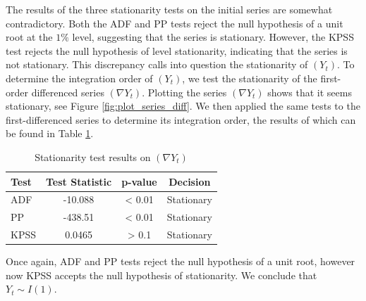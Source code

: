 \documentclass[12pt]{article}
\begin{document}
\begin{enumerate}
        The results of the three stationarity tests on the initial series are somewhat contradictory. Both the ADF and PP tests reject the null hypothesis of a unit root at the $1 \%$ level, suggesting that the series is stationary. However, the KPSS test rejects the null hypothesis of level stationarity, indicating that the series is not stationary. This discrepancy calls into question the stationarity of $(Y_t)$. To determine the integration order of $(Y_t)$, we test the stationarity of the first-order differenced series $(\nabla Y_t)$. Plotting the series $(\nabla Y_t)$ shows that it seems stationary, see Figure \ref{fig:plot_series_diff}. We then applied the same tests to the first-differenced series to determine its integration order, the results of which can be found in Table \ref{tab:stationarity_tests_diff}.
        \begin{table}[ht]
            \centering
            \begin{tabular}{l|ccc}
                \textbf{Test} & \textbf{Test Statistic} & \textbf{p-value} & \textbf{Decision} \\
                \hline
                ADF  & -10.088  & < 0.01 & Stationary \\
                PP   & -438.51  & < 0.01 & Stationary \\
                KPSS & 0.0465   & > 0.1  & Stationary
            \end{tabular}
            \caption{Stationarity test results on $(\nabla Y_t)$}
            \label{tab:stationarity_tests_diff}
        \end{table}

        Once again, ADF and PP tests reject the null hypothesis of a unit root, however now KPSS accepts the null hypothesis of stationarity. We conclude that $Y_t \sim I(1)$.


\end{enumerate}
\end{document}
